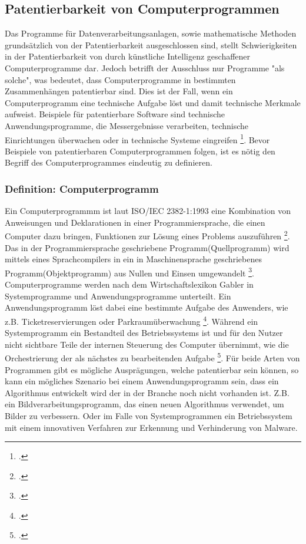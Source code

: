 \subsection{Patentierbarkeit von Computerprogrammen}
Das Programme für Datenverarbeitungsanlagen, sowie mathematische Methoden grundsätzlich
von der Patentierbarkeit ausgeschlossen sind, stellt Schwierigkeiten in der 
Patentierbarkeit von durch künstliche
Intelligenz geschaffener Computerprogramme dar. 
Jedoch betrifft der Ausschluss nur Programme "als solche", 
was bedeutet, 
dass Computerprogramme in bestimmten Zusammenhängen patentierbar sind.
Dies ist der Fall,
wenn ein Computerprogramm eine technische Aufgabe löst
und damit technische Merkmale aufweist.
Beispiele für patentierbare Software sind technische Anwendungsprogramme, 
die Messergebnisse verarbeiten, 
technische Einrichtungen überwachen oder in technische Systeme eingreifen
\footcite{RedekerITRechtSchutz}.
Bevor Beispiele von patentierbaren Computerprogrammen folgen, ist es
nötig den Begriff des Computerprogrammes eindeutig zu definieren.
\subsubsection{Definition: Computerprogramm}
Ein Computerprogrammm ist laut ISO/IEC 2382-1:1993 
eine Kombination von Anweisungen und Deklarationen in einer
Programmiersprache, die einen Computer dazu bringen, 
Funktionen zur Lösung eines Problems auszuführen 
\footcite{instituteofelectricalandelectronicsengineersinc.ISO47652010}.
Das in der Programmiersprache geschriebene Programm(Quellprogramm) wird 
mittels eines Sprachcompilers in ein in Maschinensprache geschriebenes 
Programm(Objektprogramm) aus Nullen und Einsen umgewandelt \footcite{WasIstProgramm}.
Computerprogramme werden nach dem Wirtschaftslexikon Gabler in Systemprogramme
und Anwendungsprogramme unterteilt. 
Ein Anwendungsprogramm löst dabei eine bestimmte Aufgabe des Anwenders, 
wie z.B. Ticketreservierungen oder Parkraumüberwachung 
\footcite{lackesDefinitionAnwendungsprogramm}. 
Während ein Systemprogramm ein Bestandteil des Betriebssystems ist und 
für den Nutzer nicht sichtbare Teile der internen Steuerung des Computer übernimmt,
wie die Orchestrierung der als nächstes 
zu bearbeitenden Aufgabe \footcite{lackesDefinitionSystemprogramm}.
Für beide Arten von Programmen gibt es mögliche Ausprägungen, 
welche patentierbar sein können, 
so kann ein mögliches Szenario bei einem Anwendungsprogramm sein,
dass ein Algorithmus entwickelt wird der in der Branche noch nicht vorhanden ist. 
Z.B. ein
Bildverarbeitungsprogramm, das einen neuen Algorithmus verwendet, 
um Bilder zu verbessern.
Oder im Falle von Systemprogrammen ein Betriebssystem mit einem 
innovativen Verfahren zur Erkennung und Verhinderung von Malware.

